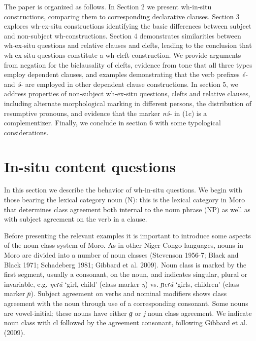 The paper is organized as follows. In Section 2 we present wh-in-situ constructions, comparing them to corresponding declarative clauses. Section 3 explores wh-ex-situ constructions identifying the basic differences between subject and non-subject wh-constructions. Section 4 demonstrates similarities between wh-ex-situ questions and relative clauses and clefts, leading to the conclusion that wh-ex-situ questions constitute a wh-cleft construction. We provide arguments from negation for the biclausality of clefts, evidence from tone that all three types employ dependent clauses, and examples demonstrating that the verb prefixes \textit{é-} and \textit{ə́-} are employed in other dependent clause constructions. In section 5, we address properties of non-subject wh-ex-situ questions, clefts and relative clauses, including alternate morphological marking in different persons, the distribution of resumptive pronouns, and evidence that the marker \textit{nə́-} in (1c) is a complementizer. Finally, we conclude in section 6 with some typological considerations. 

\section{In-situ content questions}

In this section we describe the behavior of wh-in-situ questions. We begin with those bearing the lexical category noun (N): this is the lexical category in Moro that determines class agreement both internal to the noun phrase (NP) as well as with subject agreement on the verb in a clause.  

Before presenting the relevant examples it is important to introduce some aspects of the noun class system of Moro. As in other Niger-Congo languages, nouns in Moro are divided into a number of noun classes (Stevenson 1956-7; Black and Black 1971; Schadeberg 1981; Gibbard et al. 2009). Noun class is marked by the first segment, usually a consonant, on the noun, and indicates singular, plural or invariable, e.g. \textit{ŋeɾá} ‘girl, child’ (class marker \textit{ŋ}) vs. \textit{ɲeɾá} ‘girls, children’ (class marker \textit{ɲ}). Subject agreement on verbs and nominal modifiers shows class agreement with the noun through use of a corresponding consonant. Some nouns are vowel-initial; these nouns have either \textit{ɡ} or \textit{j} noun class agreement. We indicate noun class with cl followed by the agreement consonant, following Gibbard et al. (2009). 

